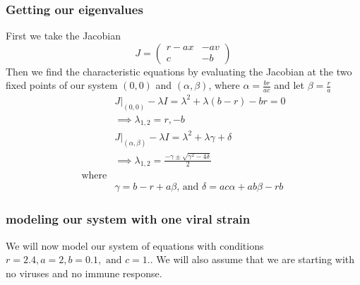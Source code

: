 \documentclass{article}
\begin{document}
\subsubsection{Getting our eigenvalues}
First we take the Jacobian
\begin{equation}
    J =
    \begin{pmatrix}
        r-ax    & -av \\
        c       & -b
    \end{pmatrix}
\end{equation}
Then we find the characteristic equations by evaluating the Jacobian at the two fixed points of our system $(0,0)$ and $(\alpha,\beta)$, where $\alpha = \frac{br}{ac} $ and let $\beta = \frac{r}{a} $
\begin{equation}
    \begin{split}
        &J|_{(0,0)} - \lambda I = \lambda^2 + \lambda(b-r) -br = 0\\
        &\implies \lambda_{1,2} = r,-b\\
        &J|_{(\alpha,\beta)}  - \lambda I =  \lambda^2 + \lambda \gamma + \delta\\ 
        &\implies \lambda_{1,2} = \frac{-\gamma \pm \sqrt{\gamma^2 - 4\delta}}{2} \\
        \text{where} \\
        &\gamma =  b - r + a\beta \text{, and } \delta = ac\alpha + ab\beta -rb
    \end{split}
\end{equation}
\subsubsection{modeling our system with one viral strain}
We will now model our system of equations with conditions $r = 2.4, a = 2, b = 0.1, \text{ and }c = 1.$. We will also assume that we are starting with no viruses and no immune response.
\label{sub:modeling our sytem}
\end{document}
